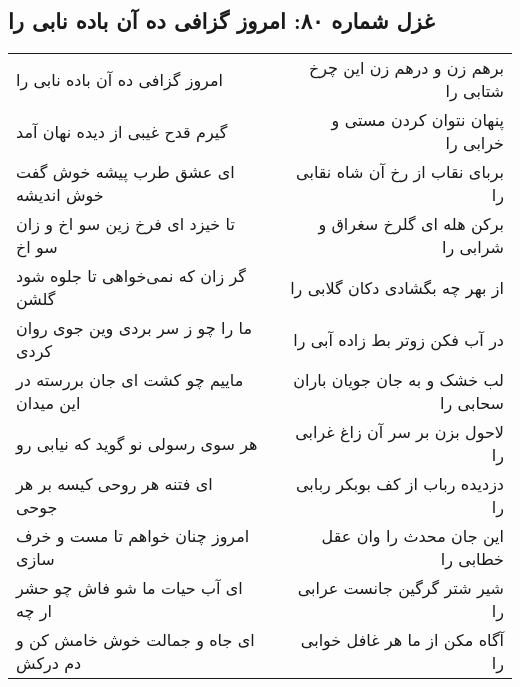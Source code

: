 \begin{center}
\section*{غزل شماره ۸۰: امروز گزافی ده آن باده نابی را}
\label{sec:0080}
\begin{longtable}{l p{0.5cm} r}
امروز گزافی ده آن باده نابی را
&&
برهم زن و درهم زن این چرخ شتابی را
\\
گیرم قدح غیبی از دیده نهان آمد
&&
پنهان نتوان کردن مستی و خرابی را
\\
ای عشق طرب پیشه خوش گفت خوش اندیشه
&&
بربای نقاب از رخ آن شاه نقابی را
\\
تا خیزد ای فرخ زین سو اخ و زان سو اخ
&&
برکن هله ای گلرخ سغراق و شرابی را
\\
گر زان که نمی‌خواهی تا جلوه شود گلشن
&&
از بهر چه بگشادی دکان گلابی را
\\
ما را چو ز سر بردی وین جوی روان کردی
&&
در آب فکن زوتر بط زاده آبی را
\\
ماییم چو کشت ای جان بررسته در این میدان
&&
لب خشک و به جان جویان باران سحابی را
\\
هر سوی رسولی نو گوید که نیابی رو
&&
لاحول بزن بر سر آن زاغ غرابی را
\\
ای فتنه هر روحی کیسه بر هر جوحی
&&
دزدیده رباب از کف بوبکر ربابی را
\\
امروز چنان خواهم تا مست و خرف سازی
&&
این جان محدث را وان عقل خطابی را
\\
ای آب حیات ما شو فاش چو حشر ار چه
&&
شیر شتر گرگین جانست عرابی را
\\
ای جاه و جمالت خوش خامش کن و دم درکش
&&
آگاه مکن از ما هر غافل خوابی را
\\
\end{longtable}
\end{center}
